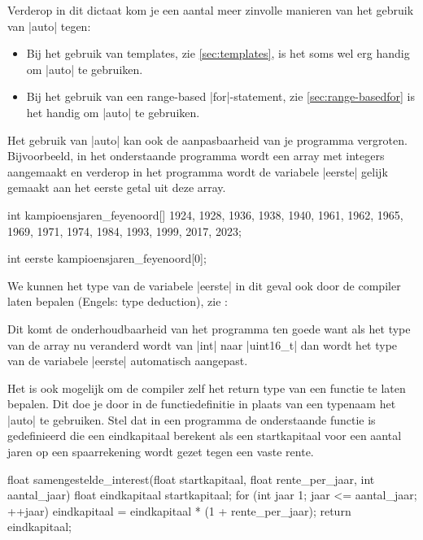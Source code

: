 \begin{cpplstShortInline}
Verderop in dit dictaat kom je een aantal meer zinvolle manieren van het gebruik van |auto| tegen:
\begin{itemize}
	\item Bij het gebruik van templates, zie \cref{sec:templates}, is het soms wel erg handig om |auto| te gebruiken.
	\item Bij het gebruik van een range-based |for|\hyp{}statement, zie \cref{sec:range-basedfor} is het handig om |auto| te gebruiken.
\end{itemize}

Het gebruik van |auto| kan ook de aanpasbaarheid van je programma vergroten.
Bijvoorbeeld, in het onderstaande programma wordt een array  met integers aangemaakt en verderop in het programma wordt de variabele |eerste| gelijk gemaakt aan het eerste getal uit deze array. 

\begin{cpplstfragment}
	int kampioensjaren_feyenoord[] {1924, 1928, 1936, 1938, 1940, 1961, 1962, 1965, 1969, 1971, 1974, 1984, 1993, 1999, 2017, 2023};

	int eerste {kampioensjaren_feyenoord[0]};
\end{cpplstfragment}

We kunnen het type van de variabele |eerste| in dit geval ook door de compiler laten bepalen (Engels: type deduction), zie : 

Dit komt de onderhoudbaarheid van het programma ten goede want als het type van de array nu veranderd wordt van |int| naar |uint16_t| dan wordt het type van de variabele |eerste| automatisch aangepast.

\label{sec:autoreturntype}
Het is ook mogelijk om de compiler zelf het return type van een functie te laten bepalen.
Dit doe je door in de functiedefinitie in plaats van een typenaam het  |auto| te gebruiken.
Stel dat in een programma de onderstaande functie  is gedefinieerd die een eindkapitaal berekent als een startkapitaal voor een aantal jaren op een spaarrekening wordt gezet tegen een vaste rente. 

\begin{cpplstfragment}
float samengestelde_interest(float startkapitaal, float rente_per_jaar, int aantal_jaar) {
	float eindkapitaal {startkapitaal};
	for (int jaar {1}; jaar <= aantal_jaar; ++jaar) {
		eindkapitaal = eindkapitaal * (1 + rente_per_jaar);
	}
	return eindkapitaal;
}
\end{cpplstfragment}


\end{cpplstShortInline}

